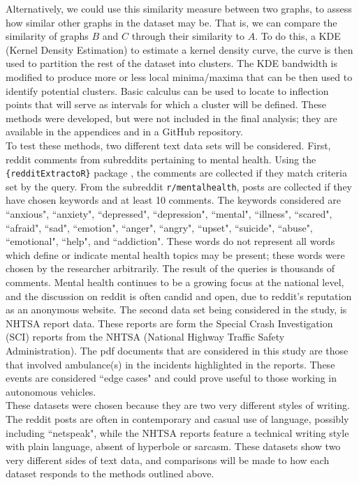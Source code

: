 Alternatively, we could use this similarity measure between two graphs, to assess how similar other graphs in the dataset may be. That is, we can compare the similarity of graphs $B$ and $C$ through their similarity to $A$. To do this, a KDE (Kernel Density Estimation) to estimate a kernel density curve, the curve is then used to partition the rest of the dataset into clusters. The KDE bandwidth is modified to produce more or less local minima/maxima that can be then used to identify potential clusters. Basic calculus can be used to locate to inflection points that will serve as intervals for which a cluster will be defined. These methods were developed, but were not included in the final analysis; they are available in the appendices and in a GitHub repository. \\

To test these methods, two different text data sets will be considered. First, reddit comments from subreddits pertaining to mental health. Using the \texttt{\{redditExtractoR\}} package \cite{rivera2015package}, the comments are collected if they match criteria set by the query. From the subreddit \texttt{r/mentalhealth}, posts are collected if they have chosen keywords and at least 10 comments. The keywords considered are ``anxious", ``anxiety", ``depressed", ``depression", ``mental", ``illness", ``scared", ``afraid", ``sad", ``emotion", ``anger", ``angry", ``upset", ``suicide", ``abuse", ``emotional", ``help", and ``addiction". These words do not represent all words which define or indicate mental health topics may be present; these words were chosen by the researcher arbitrarily. The result of the queries is thousands of comments. Mental health continues to be a growing focus at the national level, and the discussion on reddit is often candid and open, due to reddit's reputation as an anonymous website. The second data set being considered in the study, is NHTSA report data. These reports are form the Special Crash Investigation (SCI) reports from the NHTSA (National Highway Traffic Safety Administration). The pdf documents that are considered in this study are those that involved ambulance(s) in the incidents highlighted in the reports. These events are considered ``edge cases" and could prove useful to those working in autonomous vehicles. \\

These datasets were chosen because they are two very different styles of writing. The reddit posts are often in contemporary and casual use of language, possibly including ``netspeak", while the NHTSA reports feature a technical writing style with plain language, absent of hyperbole or sarcasm. These datasets show two very different sides of text data, and comparisons will be made to how each dataset responds to the methods outlined above. \\

